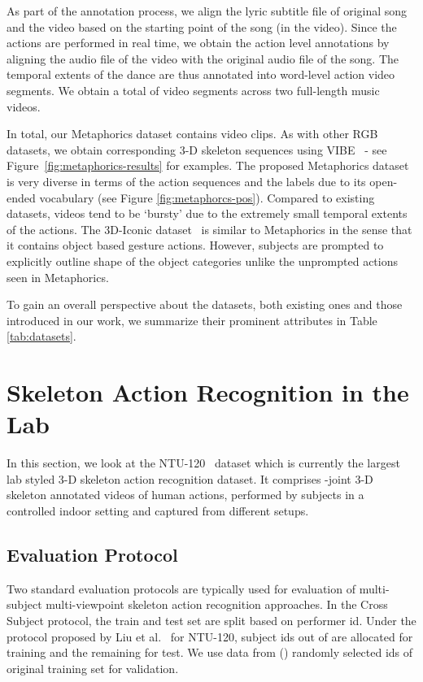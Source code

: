 \documentclass[twocolumn]{svjour3}          \smartqed  \usepackage{graphicx}
\begin{document}
As part of the annotation process, we align the lyric subtitle file of original song and the video based on the starting point of the song (in the video). Since the actions are  performed in real time, we obtain the action level annotations by aligning the audio file of the video with the original audio file of the song. The temporal extents of the dance are thus annotated into word-level action video segments. We obtain a total of  video segments across two full-length music videos.

In total, our Metaphorics dataset contains  video clips. As with other RGB datasets, we obtain corresponding 3-D skeleton sequences using VIBE~\cite{kocabas2019vibe} - see Figure~\ref{fig:metaphorics-results} for examples. The proposed Metaphorics dataset is very diverse in terms of the action sequences and the labels due to its open-ended vocabulary (see Figure \ref{fig:metaphorcs-pos}).  Compared to existing datasets, videos tend to be `bursty'  due to the extremely small temporal extents of the actions. The 3D-Iconic dataset~\cite{3DICONIC} is similar to Metaphorics in the sense that it contains object based gesture actions. However, subjects are prompted to explicitly outline shape of the object categories unlike the unprompted actions seen in Metaphorics.

To gain an overall perspective about the datasets, both existing ones and those introduced in our work, we summarize their prominent attributes in Table \ref{tab:datasets}.

\section{Skeleton Action Recognition in the Lab}
\label{sec:ntu120}

In this section, we look at the NTU-120~\cite{Liu_2019_NTURGBD120} dataset which is currently
the largest lab styled 3-D skeleton action recognition dataset. It comprises  -joint 3-D skeleton annotated videos of  human actions, performed by  subjects in a controlled indoor setting and captured from  different setups. 



\subsection{Evaluation Protocol}

Two standard evaluation protocols are typically used for
evaluation of multi-subject multi-viewpoint skeleton action
recognition approaches. In the Cross Subject protocol, the
train and test set are split based on performer id. Under the
protocol proposed by Liu et al.~\cite{Liu_2019_NTURGBD120} for NTU-120,  subject ids out of  are allocated for training and the remaining
for test. We use data from  () randomly selected ids of original training set for validation.
\end{document}
